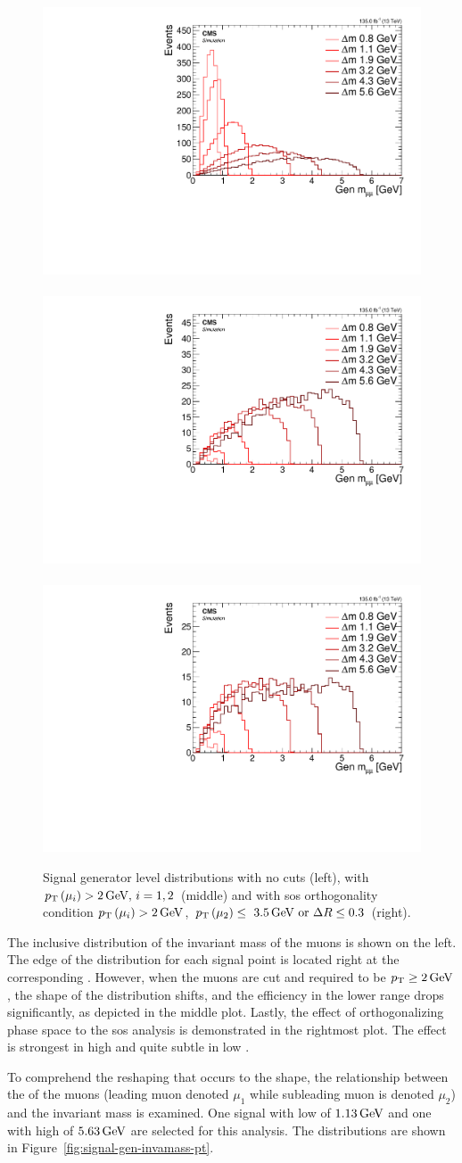 \begin{figure}[!htb]
\centering
\includegraphics[width=0.32\linewidth]{plots/signal_muons_gen/none_gen_invMass.pdf} \,
\includegraphics[width=0.32\linewidth]{plots/signal_muons_gen/none_gen_invMass_cut.pdf}  \,
\includegraphics[width=0.32\linewidth]{plots/signal_muons_gen/none_gen_invMass_orth.pdf} \\
\caption[Signal generator level \mll distributions]{ Signal generator level \mll distributions with no cuts (left), with $p_{\mathrm{T}}\left(\mu_i\right)>2\,\text{Ge\hspace{-.08em}V},\,i=1,2$ (middle) and with \gls{sos} orthogonality condition $p_{\mathrm{T}}\left(\mu_i\right)>2\,\text{Ge\hspace{-.08em}V}$, $p_{\mathrm{T}}\left(\mu_2\right)\leq~3.5\,\text{Ge\hspace{-.08em}V}\text{ or }\Delta R\leq 0.3$ (right).}
\label{fig:signal-generator-mll}
\end{figure}

The inclusive distribution of the invariant mass of the muons \mmumu is shown on the left. The edge of the \mmumu distribution for each signal point is located right at the corresponding \dm. However, when the muons \pt are cut and required to be $p_{\mathrm{T}}\geq 2\,\text{Ge\hspace{-.08em}V}$, the shape of the distribution shifts, and the efficiency in the lower \dm range drops significantly, as depicted in the middle plot. Lastly, the effect of orthogonalizing phase space to the \gls{sos} analysis is demonstrated in the rightmost plot. The effect is strongest in high \dm and quite subtle in low \dm.

To comprehend the reshaping that occurs to the \mmumu shape, the relationship between the \pt of the muons (leading muon denoted $\mu_1$ while subleading muon is denoted $\mu_2$) and the invariant mass is examined. One signal with low \dm of $1.13\,\text{Ge\hspace{-.08em}V}$ and one with high \dm of $5.63\,\text{Ge\hspace{-.08em}V}$ are selected for this analysis. The distributions are shown in Figure~\ref{fig:signal-gen-invamass-pt}.

